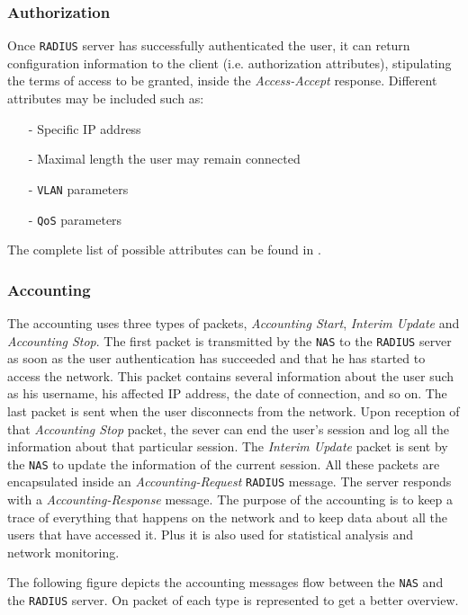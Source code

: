 \subsubsection{Authorization}
Once \texttt{RADIUS} server has successfully authenticated the user, it can return configuration information to the client (i.e. authorization attributes), stipulating the terms of access to be granted, inside the \textit{Access-Accept} response. Different attributes may be included such as:
		\begin{itemize}
			\item [-] Specific IP address

			\item [-] Maximal length the user may remain connected

			\item [-] \texttt{VLAN} parameters

			\item [-] \texttt{QoS} parameters
		\end{itemize}
	The complete list of possible attributes can be found in \cite{rfc2865}.

\subsubsection{Accounting}
The accounting uses three types of packets, \textit{Accounting Start}, \textit{Interim Update} and \textit{Accounting Stop}. The first packet is transmitted by the \texttt{NAS} to the \texttt{RADIUS} server as soon as the user authentication has succeeded and that he has started to access the network. This packet contains several information about the user such as his username, his affected IP address, the date of connection, and so on. The last packet is sent when the user disconnects from the network. Upon reception of that \textit{Accounting Stop} packet, the sever can end the user's session and log all the information about that particular session. The \textit{Interim Update} packet is sent by the \texttt{NAS} to update the information of the current session. All these packets are encapsulated inside an \textit{Accounting-Request} \texttt{RADIUS} message. The server responds with a \textit{Accounting-Response} message. The purpose of the accounting is to keep a trace of everything that happens on the network and to keep data about all the users that have accessed it. Plus it is also used for statistical analysis and network monitoring.

	The following figure depicts the accounting messages flow between the \texttt{NAS} and the \texttt{RADIUS} server. On packet of each type is represented to get a better overview.

